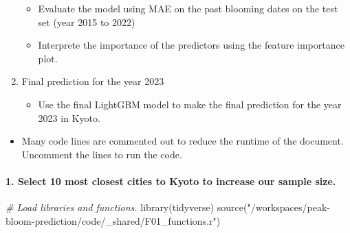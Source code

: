 \documentclass[
]{article}
\newenvironment{Shaded}{\begin{snugshade}}{\end{snugshade}}
\newcommand{\CommentTok}[1]{\textcolor[rgb]{0.56,0.35,0.01}{\textit{#1}}}
\newcommand{\FunctionTok}[1]{\textcolor[rgb]{0.00,0.00,0.00}{#1}}
\newcommand{\NormalTok}[1]{#1}
\newcommand{\StringTok}[1]{\textcolor[rgb]{0.31,0.60,0.02}{#1}}
\providecommand{\tightlist}{%
  \setlength{\itemsep}{0pt}\setlength{\parskip}{0pt}}
\begin{document}
\begin{enumerate}
  \begin{itemize}
  \item
    Evaluate the model using MAE on the past blooming dates on the test
    set (year 2015 to 2022)
  \item
    Interprete the importance of the predictors using the feature
    importance plot.
  \end{itemize}
\item
  Final prediction for the year 2023

  \begin{itemize}
  \tightlist
  \item
    Use the final LightGBM model to make the final prediction for the
    year 2023 in Kyoto.
  \end{itemize}
\end{enumerate}

\begin{itemize}
\tightlist
\item
  Many code lines are commented out to reduce the runtime of the
  document. Uncomment the lines to run the code.
\end{itemize}

\newpage

\hypertarget{select-10-most-closest-cities-to-kyoto-to-increase-our-sample-size.}{%
\paragraph{1. Select 10 most closest cities to Kyoto to increase our
sample
size.}\label{select-10-most-closest-cities-to-kyoto-to-increase-our-sample-size.}}

\begin{Shaded}
\begin{Highlighting}[]
\CommentTok{\# Load libraries and functions.}
\FunctionTok{library}\NormalTok{(tidyverse)}
\FunctionTok{source}\NormalTok{(}\StringTok{"/workspaces/peak{-}bloom{-}prediction/code/\_shared/F01\_functions.r"}\NormalTok{)}
\end{Highlighting}
\end{Shaded}
\end{document}
